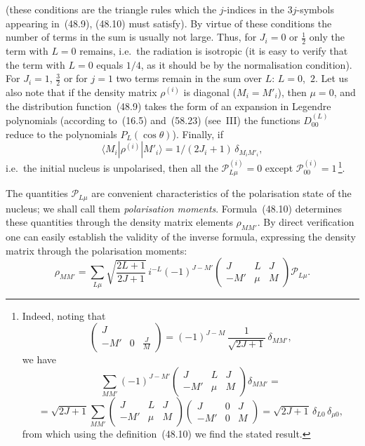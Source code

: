(these conditions are the triangle rules which the $j$-indices in the $3j$-symbols appearing in~(48.9), (48.10) must satisfy). By virtue of these conditions the number of terms in the sum is usually not large. Thus, for $J_i = 0$ or $\tfrac{1}{2}$ only the term with $L = 0$ remains, i.e.\ the radiation is isotropic (it is easy to verify that the term with $L = 0$ equals $1/4$, as it should be by the normalisation condition). For $J_i = 1$, $\tfrac{3}{2}$ or for $j = 1$ two terms remain in the sum over $L$: $L = 0$,~$2$. Let us also note that if the density matrix $\rho^{(i)}$ is diagonal ($M_i = M'_i$), then $\mu = 0$, and the distribution function~(48.9) takes the form of an expansion in Legendre polynomials (according to~(16.5) and~(58.23) (see~III) the functions $D^{(L)}_{00}$ reduce to the polynomials $P_L(\cos\theta)$).
Finally, if
\[
\langle M_i|\rho^{(i)}|M'_i\rangle = 1/(2J_i + 1)\,\delta_{M_i M'_i},
\]
i.e.\ the initial nucleus is unpolarised, then all the $\mathcal{P}^{(i)}_{L\mu} = 0$ except $\mathcal{P}^{(i)}_{00} = 1$\,\footnote{Indeed, noting that
\[
\begin{pmatrix} J \\ -M' & 0 & \frac{J}{M}\end{pmatrix} = (-1)^{J-M}\,\frac{1}{\sqrt{2J+1}}\,\delta_{MM'},
\]
we have
\[
\sum_{MM'}(-1)^{J-M'}\begin{pmatrix} J & L & J \\ -M' & \mu & M\end{pmatrix}\delta_{MM'} =
\]
\[
= \sqrt{2J+1}\sum_{MM'}\begin{pmatrix} J & L & J \\ -M' & \mu & M\end{pmatrix}\begin{pmatrix} J & 0 & J \\ -M' & 0 & M\end{pmatrix} = \sqrt{2J+1}\,\delta_{L0}\,\delta_{\mu 0},
\]
from which using the definition~(48.10) we find the stated result.}.

The quantities $\mathcal{P}_{L\mu}$ are convenient characteristics of the polarisation state of the nucleus; we shall call them \textit{polarisation moments}. Formula~(48.10) determines these quantities through the density matrix elements $\rho_{MM'}$. By direct verification one can easily establish the validity of the inverse formula, expressing the density matrix through the polarisation moments:
\begin{equation}
\rho_{MM'} = \sum_{L\mu}\sqrt{\frac{2L+1}{2J+1}}\,i^{-L}(-1)^{J-M'}\begin{pmatrix} J & L & J \\ -M' & \mu & M\end{pmatrix}\mathcal{P}_{L\mu}.
\tag{48.12}
\end{equation}

